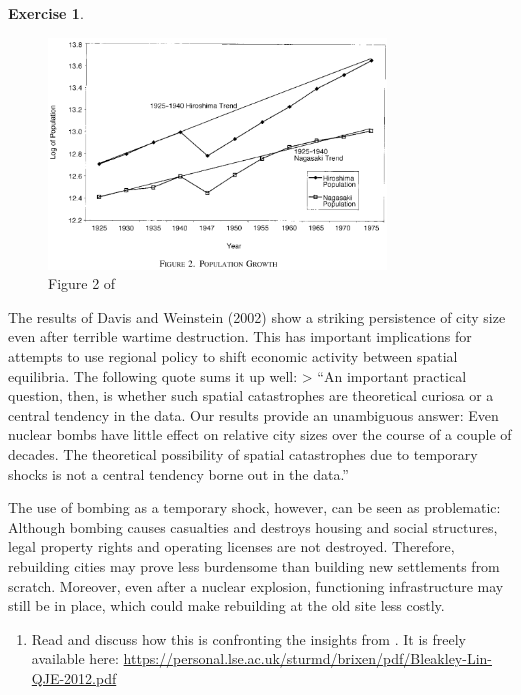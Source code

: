 \documentclass[
  12pt,
  oneside]{book}
\providecommand{\tightlist}{%
  \setlength{\itemsep}{0pt}\setlength{\parskip}{0pt}}
\theoremstyle{definition}
\theoremstyle{definition}
\theoremstyle{definition}
\newtheorem{exercise}{Exercise}[chapter]
\theoremstyle{definition}
\theoremstyle{remark}
\begin{document}
\begin{exercise}
\begin{figure}
\centering
\includegraphics[width=0.8\textwidth,height=\textheight]{fig/fig2weinstein.png}
\caption{\label{fig:fig2weinstein} Figure 2 of \citet{Davis2002Bones}}
\end{figure}

The results of Davis and Weinstein (2002) show a striking persistence of city size even after terrible wartime destruction. This has important implications for attempts to use regional policy to shift economic activity between spatial equilibria. The following quote sums it up well:
\textgreater{} ``An important practical question, then, is whether such spatial catastrophes are theoretical curiosa or a central tendency in the data. Our results provide an unambiguous answer: Even nuclear bombs have little effect on relative city sizes over the course of a couple of decades. The theoretical possibility of spatial catastrophes due to temporary shocks is not a central tendency borne out in the data.'' \citet[p.~1284]{Davis2002Bones}

The use of bombing as a temporary shock, however, can be seen as problematic:
Although bombing causes casualties and destroys housing and social structures, legal property rights and operating licenses are not destroyed. Therefore, rebuilding cities may prove less burdensome than building new settlements from scratch. Moreover, even after a nuclear explosion, functioning infrastructure may still be in place, which could make rebuilding at the old site less costly.

\begin{enumerate}
\def\labelenumi{\alph{enumi})}
\setcounter{enumi}{1}
\tightlist
\item
  Read \citet{Bleakley2012Portage} and discuss how this is confronting the insights from \citet{Davis2002Bones}. It is freely available here: \url{https://personal.lse.ac.uk/sturmd/brixen/pdf/Bleakley-Lin-QJE-2012.pdf}
\end{enumerate}

\end{exercise}
\end{document}
